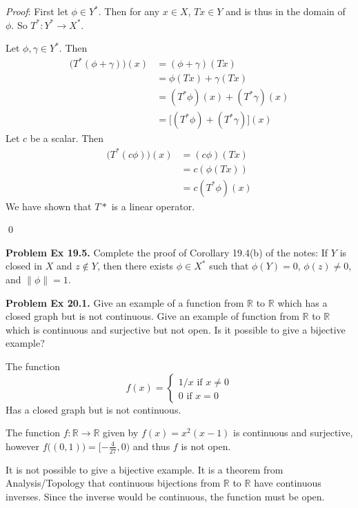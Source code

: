 \documentclass[12pt]{article}
\newcommand{\problem}[1]{\hspace{-4 ex} \large \textbf{Problem #1} }
\newcommand{\norm}[1]{\left\lVert#1\right\rVert}
\renewenvironment{proof}{\hspace{-4 ex} \emph{Proof}:}{\qed}
\newcommand{\RR}{\mathbb{R}}
\begin{document}
	\begin{proof}
		First let $\phi \in Y^*$. Then for any $x \in X$, $Tx \in Y$ and is thus in the domain of $\phi$. So $T^*: Y^* \to X^*$. \bigbreak
		
		Let $\phi, \gamma \in Y^*$. Then 
		\begin{align*}
			\big(T^*(\phi + \gamma) \big)(x) & = (\phi + \gamma)(Tx) \\
			& = \phi(Tx) + \gamma(Tx) \\
			& = (T^*\phi)(x) + (T^*\gamma)(x) \\
			& = \big[(T^*\phi)+ (T^*\gamma)\big](x)
		\end{align*}
		Let $c$ be a scalar. Then
		\begin{align*}
			\big( T^*(c\phi) \big)(x) &= (c\phi)(Tx) \\
			& = c (\phi(Tx)) \\
			& = c(T^* \phi)(x)
		\end{align*}
		We have shown that $T*$ is a linear operator. \bigbreak
		
		
	\end{proof}

\bigbreak
\problem{Ex 19.5.} Complete the proof of Corollary 19.4(b) of the notes: If $Y$ is closed in $X$ and $z\notin Y$, then there exists $\phi\in X^*$ such that $\phi(Y)=0$, $\phi(z)\neq0$, and $\norm{\phi}=1$. \bigbreak

\bigbreak
\problem{Ex 20.1.} Give an example of a function from $\RR$ to $\RR$ which has a closed graph but is not continuous. Give an example of function from $\RR$ to $\RR$ which is continuous and surjective but not open. Is it possible to give a bijective example? \bigbreak

	The function 
	$$
	f(x) = \begin{cases}
		1/x \text{\ \ \ if $x \neq 0$} \\
		0 \text{\ \ \ if $x = 0$}
	\end{cases}
	$$
	Has a closed graph but is not continuous. \bigbreak
	
	The function $f: \RR \to \RR$ given by $f(x) = x^2(x-1)$ is continuous and surjective, however $f\big( (0,1) \big) = [-\tfrac{4}{27},0)$ and thus $f$ is not open. \bigbreak
	
	It is not possible to give a bijective example. It is a theorem from Analysis/Topology that continuous bijections from $\RR$ to $\RR$ have continuous inverses. Since the inverse would be continuous, the function must be open. 
\end{document}
